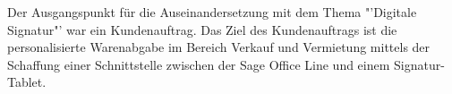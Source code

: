 Der Ausgangspunkt für die Auseinandersetzung mit dem Thema "'Digitale Signatur"' war ein Kundenauftrag. Das Ziel des Kundenauftrags ist die personalisierte Warenabgabe im Bereich Verkauf und Vermietung mittels der Schaffung einer Schnittstelle zwischen der Sage Office Line und einem Signatur-Tablet. 